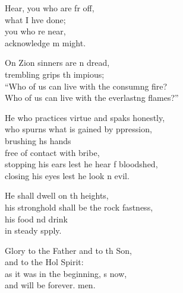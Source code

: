 \settowidth{\versewidth}{Who of us can live with the everlasting flames?”}
\begin{psalmverse}%
  \begin{patverse}
Hear, you who are fr off,\Med\\
what I hve done;\\
you who re near,\Med\\
acknowledge m might.

On Zion sinners are \pointup{\i}n dread,\Med\\
trembling grips th impious;\\
“Who of us can live with the consum\pointup{\i}ng fire?\Med\\
Who of us can live with the everlast\pointup{\i}ng flames?”

He who practices virtue and spaks honestly,\Med\\
who spurns what is gained by ppression,\\
brushing h\pointup{\i}s hands\Med\\
free of contact with  bribe,\\
stopping his ears lest he hear f bloodshed,\Med\\
closing his eyes lest he look n evil.

He shall dwell on th heights,\Med\\
his stronghold shall be the rock fastness,\\
his food nd drink\Med\\
in steady spply.

Glory to the Father and to th Son,\Med\\
and to the Hol Spirit:\\
as it was in the beginning, \pointup{\i}s now,\Med\\
and will be forever. men. 
  \end{patverse}
\end{psalmverse}
